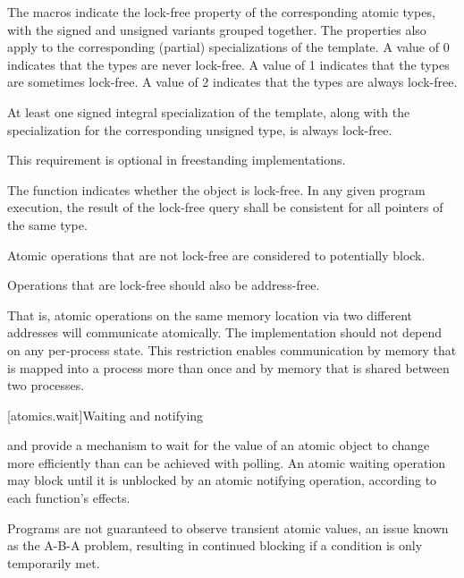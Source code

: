 \pnum
The  macros indicate the lock-free property of the
corresponding atomic types, with the signed and unsigned variants grouped
together. The properties also apply to the corresponding (partial) specializations of the
 template. A value of 0 indicates that the types are never
lock-free. A value of 1 indicates that the types are sometimes lock-free. A
value of 2 indicates that the types are always lock-free.

\pnum
At least one signed integral specialization of the  template,
along with the specialization
for the corresponding unsigned type,
is always lock-free.
\begin{note}
%
This requirement is optional in freestanding implementations.
\end{note}

\pnum
The function 
indicates whether the object is lock-free. In any given program execution, the
result of the lock-free query shall be consistent for all pointers of the same
type.

\pnum
Atomic operations that are not lock-free are considered to potentially
block.

\pnum
Operations that are lock-free should also be address-free.
\begin{note}
That is,
atomic operations on the same memory location via two different addresses will
communicate atomically. The implementation should not depend on any
per-process state. This restriction enables communication  by memory that is
mapped into a process more than once and by memory that is shared between two
processes.
\end{note}

[atomics.wait]{Waiting and notifying}

\pnum
{}
and 
provide a mechanism to wait for the value of an atomic object to change
more efficiently than can be achieved with polling.
An atomic waiting operation may block until it is unblocked
by an atomic notifying operation, according to each function's effects.
\begin{note}
Programs are not guaranteed to observe transient atomic values,
an issue known as the A-B-A problem,
resulting in continued blocking if a condition is only temporarily met.
\end{note}

